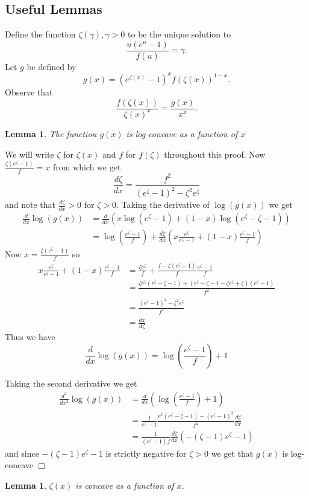 \documentclass[11pt]{article}
\newenvironment{proof}{{\bf Proof:}}{\hfill\mbox{$\Box$}}
\def\g{\gamma}
\def\z{\zeta}
\newtheorem{lemma}[theorem]{Lemma}
\newcommand{\brac}[1]{\left(#1\right)}
\newcommand{\bfrac}[2]{\brac{\frac{#1}{#2}}}
\newcommand{\beq}[1]{\begin{equation}\label{#1}}
\newcommand{\eeq}{\end{equation}}
\begin{document}
\subsection{Useful Lemmas}
Define the function $\z(\g),\g>0$ to be the unique solution to 
$$\frac{u(e^u-1)}{f(u)}=\g.$$
Let $g$ be defined by
$$g(x) = (e^{\z(x)}-1)^xf(\z(x))^{1-x}.$$
Observe that
\beq{gz}
\frac{f(\z(x))}{\z(x)^x}=\frac{g(x)}{x^x}.
\eeq
\begin{lemma}\label{use1}
The function $g(x)$ is log-concave as a function of $x$
\end{lemma}
\begin{proof}
We will write $\z$ for $\z(x)$ and $f$ for $f(\z)$ throughout this proof. Now $\frac{\z(e^\z-1)}{f} = x$ from
which we get 
\beq{dzx}
\frac{d\z}{dx} = \frac{f^2}{(e^\z-1)^2-\z^2e^\z}
\eeq
and note that $\frac{d\z}{dx}>0$ for $\z>0$. Taking the derivative of $\log(g(x))$ we get
\begin{align*}
\frac{d}{dx}\log(g(x)) &= \frac{d}{dx}\brac{x\log(e^\z-1)+(1-x)\log(e^\z-\z-1)}\\
&= \log\bfrac{e^\z-1}{f} + \frac{d\z}{dx}\brac{x \frac{e^\z}{e^\z-1}+(1-x)\frac{e^\z-1}{f}}
\end{align*}
Now $x = \frac{\z(e^\z-1)}{f}$ so 
\begin{align*}
x \frac{e^\z}{e^\z-1}+(1-x)\frac{e^\z-1}{f}&= \frac{\z e^\z}{f}+\frac{f-\z(e^\z-1)}{f}\frac{e^\z-1}{f}\\
&= \frac{\z e^\z(e^\z-\z-1)+(e^\z-\z-1 - \z e^\z+\z)(e^\z-1)}{f^2}\\
&= \frac{(e^\z-1)^2-\z^2e^\z}{f^2}\\
&= \frac{dx}{d\z}
\end{align*}
Thus we have
\beq{gdash}
\frac{d}{dx}\log(g(x)) = \log\bfrac{e^\z-1}{f}+1
\eeq

Taking the second derivative we get
\begin{align*}
\frac{d^2}{dx^2}\log(g(x)) &= \frac{d}{dx}\brac{\log\bfrac{e^\z-1}{f}+1}\\
&= \frac{f}{e^\z-1}\frac{e^z(e^\z-\z-1)-(e^\z-1)^2}{f^2}\frac{d\z}{dx}\\
&= \frac{1}{(e^\z-1)f}\frac{d\z}{dx}\brac{-(\z-1)e^\z-1}
\end{align*}
and since $-(\z-1)e^\z-1$ is strictly negative for $\z>0$ we get that $g(x)$ is log-concave
\end{proof}
\begin{lemma}\label{use2}
$\z(x)$ is concave as a function of $x$.
\end{lemma}
\end{document}
